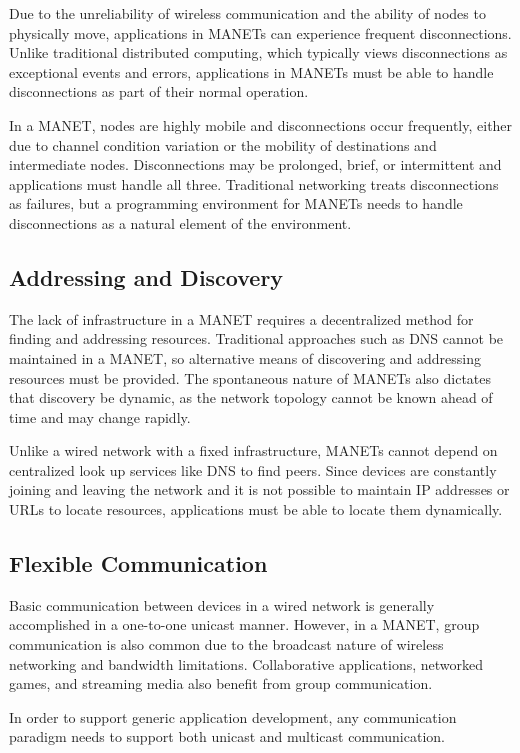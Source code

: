 Due to the unreliability of wireless communication and the ability of nodes to physically move, applications in MANETs can experience frequent disconnections. Unlike traditional distributed computing, which typically views disconnections as exceptional events and errors, applications in MANETs must be able to handle disconnections as part of their normal operation.

In a MANET, nodes are highly mobile and disconnections occur frequently, either due to channel condition variation or the mobility of destinations and intermediate nodes. Disconnections may be prolonged, brief, or intermittent and applications must handle all three. Traditional networking treats disconnections as failures, but a programming environment for MANETs needs to handle disconnections as a natural element of the environment.

\subsection{Addressing and Discovery}

The lack of infrastructure in a MANET requires a decentralized method for finding and addressing resources. Traditional approaches such as DNS cannot be maintained in a MANET, so alternative means of discovering and addressing resources must be provided. The spontaneous nature of MANETs also dictates that discovery be dynamic, as the network topology cannot be known ahead of time and may change rapidly.

Unlike a wired network with a fixed infrastructure, MANETs cannot depend on centralized look up services like DNS to find peers. Since devices are constantly joining and leaving the network and it is not possible to maintain IP addresses or URLs to locate resources, applications must be able to locate them dynamically.

\subsection{Flexible Communication}

Basic communication between devices in a wired network is generally accomplished in a one-to-one unicast manner. However, in a MANET, group communication is also common due to the broadcast nature of wireless networking and bandwidth limitations. Collaborative applications, networked games, and streaming media also benefit from group communication.

In order to support generic application development, any communication paradigm needs to support both unicast and multicast communication.

